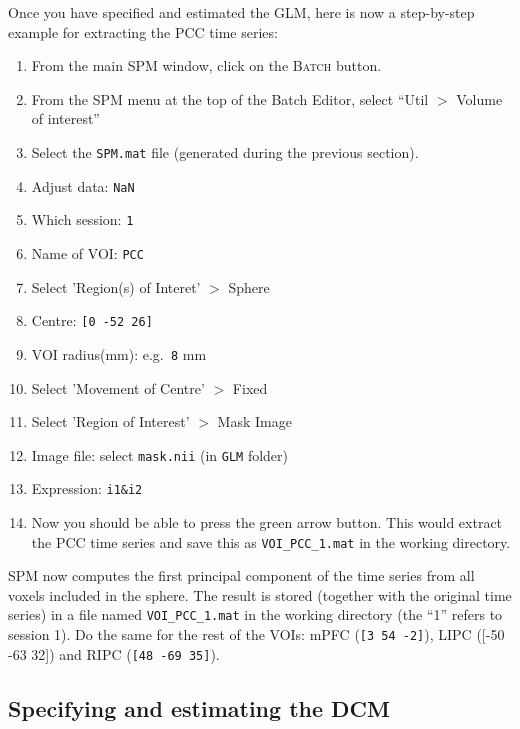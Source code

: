 Once you have specified and estimated the GLM, here is now a step-by-step example for extracting the PCC time series:
\begin{enumerate}
 \item From the main SPM window, click on the \textsc{Batch} button.
 \item From the SPM menu at the top of the Batch Editor, select ``Util $>$ Volume of interest''
 \item Select the \texttt{SPM.mat} file (generated during the previous section).
 \item Adjust data: \texttt{NaN}
 \item Which session: \texttt{1}
 \item Name of VOI: \texttt{PCC}
 \item Select 'Region(s) of Interet' $>$ Sphere
 \item Centre: \texttt{[0 -52 26]}
 \item VOI radius(mm): e.g.\texttt{ 8} mm
 \item Select 'Movement of Centre' $>$ Fixed
 \item Select 'Region of Interest' $>$ Mask Image
 \item Image file: select \texttt{mask.nii} (in \texttt{GLM} folder)
 \item Expression: \texttt{i1\&i2}
 \item Now you should be able to press the green arrow button. This would extract the PCC time series and save this as  \texttt{VOI\_PCC\_1.mat} in the working directory.
\end{enumerate}
SPM now computes the first principal component of the time series from all voxels included in the sphere. The result is stored (together with the original time series) in a file named \texttt{VOI\_PCC\_1.mat} in the working directory (the ``1'' refers to session 1). Do the same for the rest of the VOIs: mPFC (\texttt{[3 54 -2]}), LIPC ({[-50 -63 32]}) and RIPC (\texttt{[48 -69 35]}).

\subsection{Specifying and estimating the DCM}

